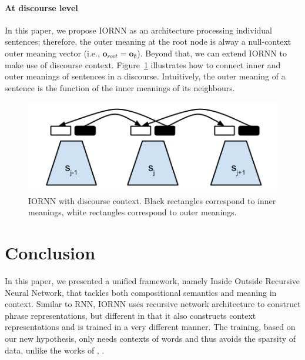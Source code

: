 \documentclass[11pt]{article}
\begin{document}
\paragraph{At discourse level} In this paper, we propose IORNN as an architecture 
processing individual sentences; therefore, the outer meaning at the root node is alway a 
null-context outer meaning vector (i.e., $\mathbf{o}_{root} = \mathbf{o}_{\emptyset}$).
Beyond that, we can extend IORNN to make use of discourse context.
Figure~\ref{figure dciornn} illustrates how to connect inner and outer meanings 
of sentences in a discourse. Intuitively, the outer meaning of a sentence is 
the function of the inner meanings of its neighbours.

\begin{figure}[h!]
	\center
	\includegraphics[scale=0.5]{DC-IO-RNN.png}
	\caption{IORNN with discourse context. 
	Black rectangles correspond to inner meanings, 
	white rectangles correspond to outer meanings.}
	\label{figure dciornn}
\end{figure}



\section{Conclusion}
\label{section conclusion}

In this paper, we presented a unified framework, namely Inside Outside Recursive
Neural Network, that tackles both compositional semantics and meaning in context. 
Similar to RNN, IORNN uses recursive network architecture to construct 
phrase representations, but different in that it also constructs context representations and 
is trained in a very different manner. The training, based on our new hypothesis, 
only needs contexts of words and thus avoids the sparsity of data, unlike the works of 
, .






\end{document}
